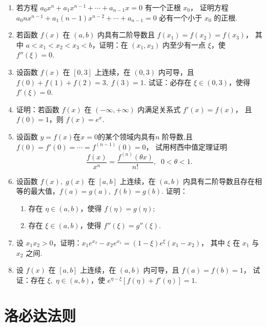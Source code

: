 \begin{enumerate}
    \item 若方程 $a_0x^n+a_1x^{n-1}+\cdots+a_{n-1}x=0$ 有一个正根 $x_0$，
    证明方程 $a_0nx^{n-1}+a_1(n-1)x^{n-2}+\cdots+a_{n-1}=0$ 必有一个小于 $x_0$ 的正根.

    \item 若函数 $f(x)$ 在 $(a,b)$ 内具有二阶导数且 $f(x_1)=f(x_2)=f(x_3)$，
    其中 $a<x_1<x_2<x_3<b$，证明：在 $(x_1,x_3)$ 内至少有一点 $\xi$，使 $f''(\xi)=0$.

    \item 设函数 $f(x)$ 在 $[0,3]$ 上连续，在 $(0,3)$ 内可导，且 $f(0)+f(1)+f(2)=3,\;f(3)=1$. 
    试证：必存在 $\xi\in(0,3)$，使得 $f'(\xi)=0$.

    \item 证明：若函数 $f(x)$ 在 $(-\infty,+\infty)$ 内满足关系式 $f'(x)=f(x)$，
    且 $f(0)=1$，则 $f(x)=e^x$.

    \item 设函数 $y=f(x)$在$x=0$的某个领域内具有$n$ 阶导数,且 $f(0)=f'(0)=\cdots=f^{(n-1)}(0)=0$，
    试用柯西中值定理证明
    \[
        \dfrac{f(x)}{x^n}=\dfrac{f^{(n)}(\theta x)}{n!},\;\;0<\theta<1.
    \]

    \item 设函数 $f(x),\;g(x)$ 在 $[a,b]$ 上连续，在 $(a,b)$ 内具有二阶导数且存在相等的最大值，$f(a)=g(a),\;f(b)=g(b)$. 
    证明：
    \begin{enumerate}[(1)]\setlength{\itemsep}{5pt}\setlength{\topsep}{15pt}
        \item 存在 $\eta\in(a,b)$，使得 $f(\eta)=g(\eta)$;
        \item 存在 $\xi\in(a,b)$，使得 $f''(\xi)=g''(\xi)$.
    \end{enumerate}
    
    \item 设 $x_1x_2>0$，证明：$x_1e^{x_2}-x_2e^{x_1}=(1-\xi)e^{\xi}(x_1-x_2)$，
    其中 $\xi$ 在 $x_1$ 与 $x_2$ 之间.

    \item 设 $f(x)$ 在 $[a,b]$ 上连续，在 $(a,b)$ 内可导，且 $f(a)=f(b)=1$，
    试证：存在 $\xi,\;\eta\in(a,b)$，使 $e^{\eta-\xi}[f(\eta)+f'(\eta)]=1$.
\end{enumerate}

\section{洛必达法则}


